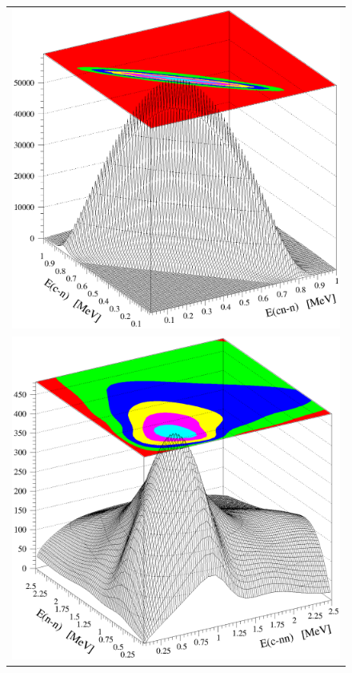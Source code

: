 \begin{figure}[tbh]
\begin{center}
\begin{tabular}{c}
\includegraphics[scale=0.31]{figures/2+cnj=2-2.eps}      \\
\includegraphics[scale=0.31]{figures/1mnntot2.eps} %

\end{tabular}
\end{center}
\end{figure}
